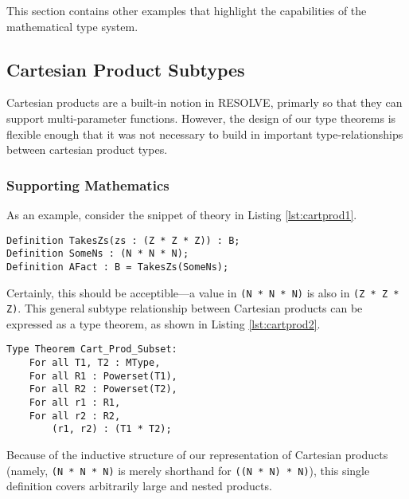 This section contains other examples that highlight the capabilities of the mathematical type system.

	\subsection{Cartesian Product Subtypes}	

Cartesian products are a built-in notion in RESOLVE, primarly so that they can support multi-parameter functions.  However, the design of our type theorems is flexible enough that it was not necessary to build in important type-relationships between cartesian product types.

		\subsubsection{Supporting Mathematics}	

As an example, consider the snippet of theory in Listing \ref{lst:cartprod1}.

\begin{lstlisting}[float=h,language=resolve,caption={Passing a Cartesian product subtype\label{lst:cartprod1}}]
Definition TakesZs(zs : (Z * Z * Z)) : B;
Definition SomeNs : (N * N * N);
Definition AFact : B = TakesZs(SomeNs);
\end{lstlisting}

Certainly, this should be acceptible---a value in \texttt{(N * N * N)} is also in \texttt{(Z * Z * Z)}.  This general subtype relationship between Cartesian products can be expressed as a type theorem, as shown in Listing \ref{lst:cartprod2}.

\begin{lstlisting}[float=h,language=resolve,caption={A type theorem expressing Cartesian subtypes\label{lst:cartprod2}}]
Type Theorem Cart_Prod_Subset:
	For all T1, T2 : MType,
	For all R1 : Powerset(T1),
	For all R2 : Powerset(T2),
	For all r1 : R1,
	For all r2 : R2,
		(r1, r2) : (T1 * T2);
\end{lstlisting}

Because of the inductive structure of our representation of Cartesian products (namely, \texttt{(N~*~N~*~N)} is merely shorthand for \texttt{((N~*~N)~*~N)}), this single definition covers arbitrarily large and nested products.

